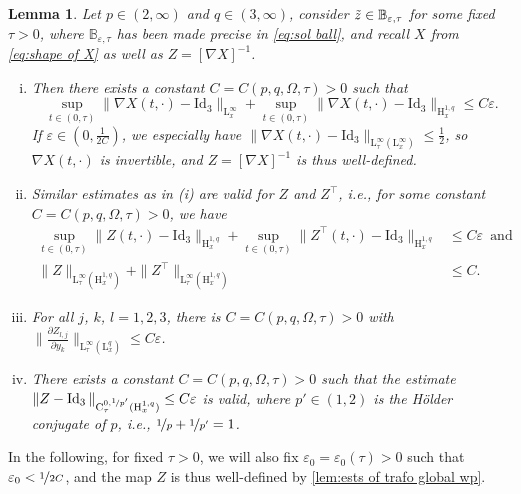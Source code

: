 \documentclass[10pt]{amsart}
\theoremstyle{plain}
\newtheorem{lem}[lem]{Lemma}
\theoremstyle{definition}
\theoremstyle{thm}
\numberwithin{equation}{section}
\newcommand{\rL}{\mathrm{L}}
\newcommand{\rH}{\mathrm{H}}
\newcommand{\rC}{\mathrm{C}}
\newcommand{\del}{\partial}
\newcommand{\eps}{\varepsilon}
\DeclareMathOperator{\Id}{Id}
\newcommand{\tand}{\enspace \text{and} \enspace}
\newcommand{\tz}{\Tilde{z}}
\begin{document}
\begin{lem}\label{lem:ests of trafo global wp}
Let $p \in (2,\infty)$ and $q \in (3,\infty)$, consider $\tz \in \mathbb{B}_{\eps, \tau}$ for some fixed~$\tau > 0$, where $\mathbb{B}_{\eps, \tau}$ has been made precise in \eqref{eq:sol ball}, and recall $X$ from \eqref{eq:shape of X} as well as $Z = [\nabla X]^{-1}$.  
\begin{enumerate}[(i)]
    \item Then there exists a constant $C = C(p,q,\Omega,\tau) > 0$ such that
    \begin{equation*}
        \sup_{t \in (0,\tau
    )} \| \nabla X(t,\cdot) - \mathrm{Id}_3 \|_{\rL_x^\infty} + \sup_{t \in (0,\tau)} \| \nabla X(t,\cdot) - \mathrm{Id}_3 \|_{\rH_x^{1,q}} \le C \eps.
    \end{equation*}
    If $\eps\in (0,\frac{1}{2C})$, we especially have $\| \nabla X(t,\cdot) - \mathrm{Id}_3 \|_{\rL_\tau^\infty(\rL_x^\infty)} \le \frac{1}{2}$, so $\nabla X(t,\cdot)$ is invertible, and $Z = [\nabla X]^{-1}$ is thus well-defined.
    \item Similar estimates as in (i) are valid for $Z$ and $Z^\top$, i.e., for some constant $C = C(p,q,\Omega,\tau) > 0$, we have
    \begin{equation*}
        \begin{aligned}
            \sup_{t \in (0,\tau)} \| Z(t,\cdot) - \mathrm{Id}_3 \|_{\rH_x^{1,q}} + \sup_{t \in (0,\tau)} \| Z^\top(t,\cdot) - \mathrm{Id}_3 \|_{\rH_x^{1,q}} 
            &\le C \eps \tand\\
            \| Z \|_{\rL_\tau^\infty(\rH_x^{1,q})} + \| Z^\top \|_{\rL_\tau^\infty(\rH_x^{1,q})} 
            &\le C.
        \end{aligned}
    \end{equation*}
    \item For all $j$, $k$, $l = 1,2,3$, there is $C = C(p,q,\Omega,\tau) > 0$ with $\bigl\| \frac{\del Z_{l,j}}{\del y_k} \bigr\|_{\rL_\tau^\infty(\rL_x^q)} \le C \eps$.
    \item There exists a constant $C = C(p,q,\Omega,\tau) > 0$ such that the estimate $\| Z - \Id_3 \|_{\rC_\tau^{0,\nicefrac{1}{p'}}(\rH_x^{1,q})} \le C \eps$ is valid, where $p' \in (1,2)$ is the H\"older conjugate of $p$, i.e., $\nicefrac{1}{p}+\nicefrac{1}{p'}=1$.
\end{enumerate}
\end{lem}

In the following, for fixed $\tau > 0$, we will also fix $\eps_0 = \eps_0(\tau) > 0$ such that $\eps_0 < \nicefrac{1}{2C}$, and the map $Z$ is thus well-defined by \autoref{lem:ests of trafo global wp}.
\end{document}

